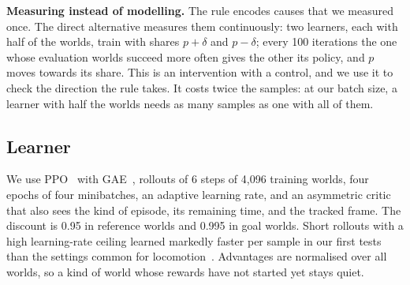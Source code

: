 \textbf{Measuring instead of modelling.} The rule encodes causes that we measured once. The direct alternative measures them continuously: two learners, each with half of the worlds, train with shares $p+\delta$ and $p-\delta$; every 100 iterations the one whose evaluation worlds succeed more often gives the other its policy, and $p$ moves towards its share. This is an intervention with a control, and we use it to check the direction the rule takes. It costs twice the samples: at our batch size, a learner with half the worlds needs as many samples as one with all of them.

\subsection{Learner}

We use PPO~\cite{ppo} with GAE~\cite{gae}, rollouts of 6 steps of 4{,}096 training worlds, four epochs of four minibatches, an adaptive learning rate, and an asymmetric critic~\cite{pinto2018asymmetric} that also sees the kind of episode, its remaining time, and the tracked frame. The discount is 0.95 in reference worlds and 0.995 in goal worlds. Short rollouts with a high learning-rate ceiling learned markedly faster per sample in our first tests than the settings common for locomotion~\cite{rudin2022minutes}. Advantages are normalised over all worlds, so a kind of world whose rewards have not started yet stays quiet.
